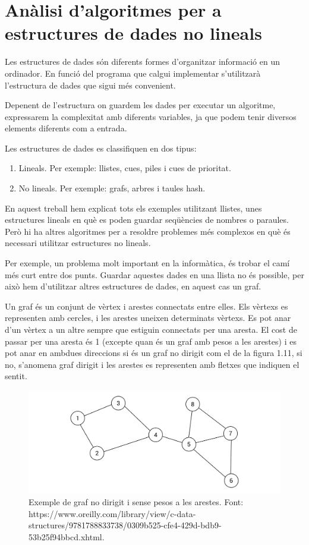 \section{Anàlisi d'algoritmes per a estructures de dades no lineals}
Les estructures de dades són diferents formes d'organitzar informació en un ordinador. En funció del programa que calgui implementar s'utilitzarà l'estructura de dades que sigui més convenient.

Depenent de l'estructura on guardem les dades per executar un algoritme, expressarem la complexitat amb diferents variables, ja que podem tenir diversos elements diferents com a entrada.

Les estructures de dades es classifiquen en dos tipus:
\begin{enumerate}
    \item Lineals. Per exemple: llistes, cues, piles i cues de prioritat.
    \item No lineals. Per exemple: grafs, arbres i taules hash.
\end{enumerate}

En aquest treball hem explicat tots els exemples utilitzant llistes, unes estructures lineals en què es poden guardar seqüències de nombres o paraules. Però hi ha altres algoritmes per a resoldre problemes més complexos en què és necessari utilitzar estructures no lineals. 

Per exemple, un problema molt important en la informàtica, és trobar el camí més curt entre dos punts. Guardar aquestes dades en una llista no és possible, per això hem d'utilitzar altres estructures de dades, en aquest cas un graf.

Un graf és un conjunt de vèrtex i arestes connectats entre elles. Els vèrtexs es representen amb cercles, i les arestes uneixen determinats vèrtexs. Es pot anar d'un vèrtex a un altre sempre que estiguin connectats per una aresta. El cost de passar per una aresta és 1 (excepte quan és un graf amb pesos a les arestes) i es pot anar en ambdues direccions si és un graf no dirigit com el de la figura 1.11, si no, s'anomena graf dirigit i les arestes es representen amb fletxes que indiquen el sentit.
\vspace{18pt}
\begin{figure}[H]
    \centering
    \includegraphics[width=.75\textwidth]{capitols/figures/7.png}
    \caption[Exemple de graf no dirigit i sense pesos a les arestes.]{Exemple de graf no dirigit i sense pesos a les arestes. Font: \\ https://www.oreilly.com/library/view/c-data-structures/9781788833738/0309b525-cfe4-429d-bdb9-53b25f94bbcd.xhtml.}
    \label{Figura}
\end{figure}

